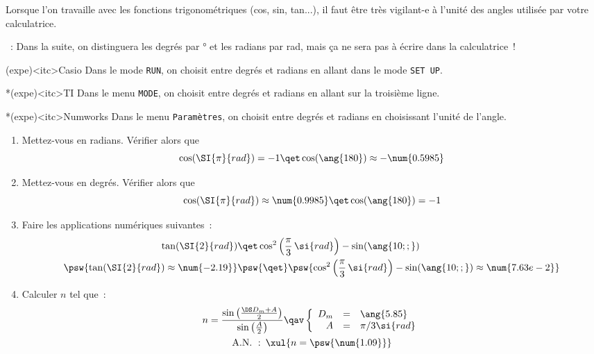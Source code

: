 \documentclass[../main/main.tex]{subfiles}
\begin{document}
Lorsque l'on travaille avec les fonctions trigonométriques (cos, sin, tan...),
il faut être très vigilant-e à l'unité des angles utilisée par votre
calculatrice.

~: Dans la suite, on distinguera les degrés par \si{\degree}
et les radians par \si{rad}, mais ça ne sera pas à écrire dans la calculatrice~!

\begin{tcbraster}[raster columns=3, raster equal height=rows]
	\begin{tcb}(expe)<itc>{Casio}
		Dans le mode \texttt{RUN}, on choisit entre degrés et radians en allant dans
		le mode \texttt{SET UP}.
	\end{tcb}
	\begin{tcb}*(expe)<itc>{TI}
		Dans le menu \texttt{MODE}, on choisit entre degrés et radians en allant sur
		la troisième ligne.
	\end{tcb}
	\begin{tcb}*(expe)<itc>{Numworks}
		Dans le menu \texttt{Paramètres}, on choisit entre degrés et radians en
		choisissant l'unité de l'angle.
	\end{tcb}
\end{tcbraster}

\begin{enumerate}
	\item Mettez-vous en radians. Vérifier alors que
	      \[
		      \cos(\SI{\pi}{rad}) = -1
		      \qet
		      \cos(\ang{180}) \approx -\num{0.5985}
	      \]
	\item Mettez-vous en degrés. Vérifier alors que
	      \[
		      \cos(\SI{\pi}{rad}) \approx \num{0.9985}
		      \qet
		      \cos(\ang{180}) =-1
	      \]
	\item Faire les applications numériques suivantes~:
	      \begin{align*}
		      \tan(\SI{2}{rad})
		       & \qet
		      \cos^2\left(\frac{\pi}{3}\,\si{rad}\right) -\sin(\ang{10;;})
		      \\
		      \psw{
			      \tan(\SI{2}{rad}) \approx \num{-2.19}
		      }
		       & \psw{\qet}
		      \psw{
			      \cos^2\left(\frac{\pi}{3}\,\si{rad}\right) -\sin(\ang{10;;}) \approx
			      \num{7.63e-2}
		      }
	      \end{align*}
	\item Calculer $n$ tel que~:
	      \vspace{-20pt}
	      \begin{gather*}
		      n =
		      \frac{\sin\left(\frac{\DS D_m+A}{2}\right)}{\sin\left(\frac{A}{2}\right)}
		      \qav
		      \left\{
		      \begin{array}{rcl}
			      D_m & = & \ang{5.85}
			      \\
			      A   & = & \pi/3 \si{rad}
		      \end{array}
		      \right.\\
		      \mathrm{A.N.~:}\enskip
		      \xul{
			      n = \psw{ \num{1.09} }
		      }
	      \end{gather*}
\end{enumerate}
\end{document}
